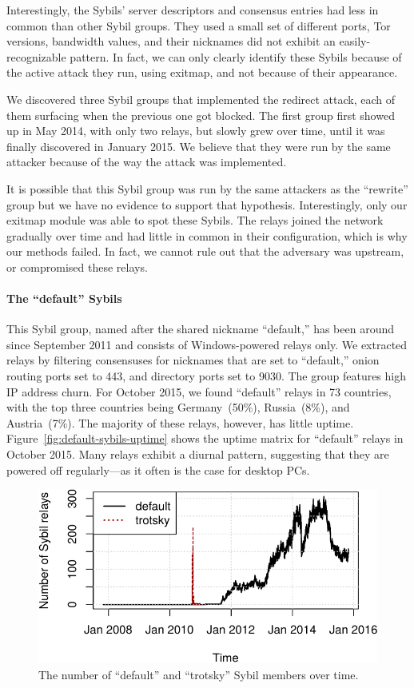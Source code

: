 Interestingly, the Sybils' server descriptors and consensus entries had less in
common than other Sybil groups.  They used a small set of different ports, Tor
versions, bandwidth values, and their nicknames did not exhibit an
easily-recognizable pattern.  In fact, we can only clearly identify these Sybils
because of the active attack they run, using exitmap, and not because of their
appearance.

We discovered three Sybil groups that implemented the redirect attack, each of
them surfacing when the previous one got blocked.  The first group first showed
up in May 2014, with only two relays, but slowly grew over time, until it was
finally discovered in January 2015.  We believe that they were run by the same
attacker because of the way the attack was implemented.

It is possible that this Sybil group was run by the same attackers as the
``rewrite'' group but we have no evidence to support that hypothesis.
Interestingly, only our exitmap module was able to spot these Sybils.  The
relays joined the network gradually over time and had little in common in their
configuration, which is why our \sys methods failed.  In fact, we cannot
rule out that the adversary was upstream, or compromised these relays.

\paragraph{The ``default'' Sybils}
This Sybil group, named after the shared nickname ``default,'' has been around
since September 2011 and consists of Windows-powered relays only.  We extracted
relays by filtering consensuses for nicknames that are set to ``default,'' onion
routing ports set to 443, and directory ports set to 9030.  The group features
high IP address churn.  For October 2015, we found ``default'' relays in 73
countries, with the top three countries being Germany~(50\%), Russia~(8\%), and
Austria~(7\%).  The majority of these relays, however, has little uptime.
Figure~\ref{fig:default-sybils-uptime} shows the uptime matrix for ``default''
relays in October 2015.  Many relays exhibit a diurnal pattern, suggesting that
they are powered off regularly---as it often is the case for desktop PCs.

\begin{figure}[t]
	\centering
	\includegraphics[width=\linewidth]{diagrams/default-over-time}
	\caption{The number of ``default'' and ``trotsky'' Sybil members over time.}
	\label{fig:default-over-time}
\end{figure}

